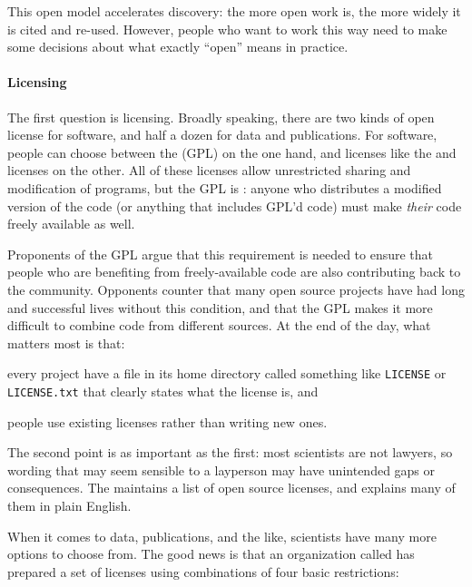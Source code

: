 \documentclass{book}
\begin{document}
This open model accelerates discovery: the more open work is, the more
widely it is cited and re-used. However, people who want to work this
way need to make some decisions about what exactly ``open'' means in
practice.

\mbox{}\paragraph{Licensing}

The first question is licensing. Broadly speaking, there are two kinds
of open license for software, and half a dozen for data and
publications. For software, people can choose between the
 (GPL)
on the one hand, and licenses like the
 and
 licenses on the
other. All of these licenses allow unrestricted sharing and modification
of programs, but the GPL is :
anyone who distributes a modified version of the code (or anything that
includes GPL'd code) must make \emph{their} code freely available as
well.

Proponents of the GPL argue that this requirement is needed to ensure
that people who are benefiting from freely-available code are also
contributing back to the community. Opponents counter that many open
source projects have had long and successful lives without this
condition, and that the GPL makes it more difficult to combine code from
different sources. At the end of the day, what matters most is that:

\begin{swcenumerate}
\item
  every project have a file in its home directory called something like
  \texttt{LICENSE} or \texttt{LICENSE.txt} that clearly states what the
  license is, and
\item
  people use existing licenses rather than writing new ones.
\end{swcenumerate}

The second point is as important as the first: most scientists are not
lawyers, so wording that may seem sensible to a layperson may have
unintended gaps or consequences. The  maintains a list of open source licenses, and
 explains many of them in
plain English.

When it comes to data, publications, and the like, scientists have many
more options to choose from. The good news is that an organization
called  has prepared
a set of licenses using combinations of four basic restrictions:
\end{document}
